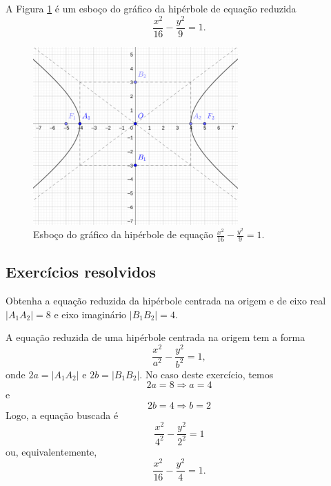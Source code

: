 \begin{ex}
  A Figura \ref{fig:ex_hiperbole} é um esboço do gráfico da hipérbole de equação reduzida
  \begin{equation}
    \frac{x^2}{16} - \frac{y^2}{9} = 1.
  \end{equation}

  \begin{figure}[H]
    \centering
    \includegraphics[width=0.7\textwidth]{cap_conicas/dados/fig_ex_hiperbole/fig}
    \caption{Esboço do gráfico da hipérbole de equação $\displaystyle\frac{x^2}{16}-\frac{y^2}{9}=1$.}
    \label{fig:ex_hiperbole}
  \end{figure}  
\end{ex}

\subsection*{Exercícios resolvidos}

\begin{exeresol}
  Obtenha a equação reduzida da hipérbole centrada na origem e de eixo real $|A_1A_2|=8$ e eixo imaginário $|B_1B_2|=4$.
\end{exeresol}
\begin{resol}
  A equação reduzida de uma hipérbole centrada na origem tem a forma
  \begin{equation}
    \frac{x^2}{a^2} - \frac{y^2}{b^2} = 1,
  \end{equation}
  onde $2a = |A_1A_2|$ e $2b=|B_1B_2|$. No caso deste exercício, temos
  \begin{equation}
    2a = 8 \Rightarrow a = 4
  \end{equation}
  e
  \begin{equation}
    2b = 4 \Rightarrow b = 2
  \end{equation}
  Logo, a equação buscada é
  \begin{equation}
    \frac{x^2}{4^2} - \frac{y^2}{2^2} = 1
  \end{equation}
  ou, equivalentemente,
  \begin{equation}
    \frac{x^2}{16} - \frac{y^2}{4} = 1.
  \end{equation}  
\end{resol}


